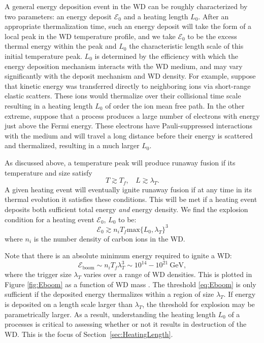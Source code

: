\documentclass[twocolumn,showpacs,preprintnumbers,amsmath,amssymb,prd]{revtex4}
\newcommand{\GeV}{\text{GeV}}
\begin{document}
A general energy deposition event in the WD can be roughly characterized by two parameters: an energy deposit $\mathcal{E}_0$ and a heating length $L_0$.  After an appropriate thermalization time, such an energy deposit will take the form of a local peak in the WD temperature profile, and we take $\mathcal{E}_0$ to be the excess thermal energy within the peak and $L_0$ the characteristic length scale of this initial temperature peak.  $L_0$ is determined by the efficiency with which the energy deposition mechanism interacts with the WD medium, and may vary significantly with the deposit mechanism and WD density.  For example, suppose that kinetic energy was transferred directly to neighboring ions via short-range elastic scatters. These ions would thermalize over their collisional time scale resulting in a heating length $L_0$ of order the ion mean free path. In the other extreme, suppose that a process produces a large number of electrons with energy just above the Fermi energy.  These electrons have Pauli-suppressed interactions with the medium and will travel a long distance before their energy is scattered and thermalized, resulting in a much larger $L_0$.

As discussed above, a temperature peak will produce runaway fusion if its temperature and size satisfy
\begin{equation}
\label{eq:runaway}
  T \gtrsim T_f, ~~~~ L \gtrsim \lambda_T.
\end{equation}
A given heating event will eventually ignite runaway fusion if at any time in its thermal evolution it satisfies these conditions.  This will be met if a heating event deposits both sufficient total energy \emph{and} energy density.  We find the explosion condition for a heating event $\mathcal{E}_0$, $L_0$ to be:
\begin{equation}
\label{eq:boom}
  \mathcal{E}_0 \gtrsim n_i T_f \text{max}\{L_0, \lambda_T\}^3
\end{equation}
where $n_i$ is the number density of carbon ions in the WD.

Note that there is an absolute minimum energy required to ignite a WD:
\begin{equation}
\label{eq:Eboom}
\mathcal{E}_{\text{boom}} \sim n_i T_f \lambda_T^3 \sim 10^{14} - 10^{21} ~\GeV,
\end{equation}
where the trigger size $\lambda_T$ varies over a range of WD densities.  This is plotted in Figure \ref{fig:Eboom} as a function of WD mass \cite{website}.  The threshold \eqref{eq:Eboom} is only sufficient if the deposited energy thermalizes within a region of size $\lambda_T$.  If energy is deposited on a length scale larger than $\lambda_T$, the threshold for explosion may be parametrically larger.  As a result, understanding the heating length $L_0$ of a processes is critical to assessing whether or not it results in destruction of the WD. This is the focus of Section~\ref{sec:HeatingLength}.
\end{document}
